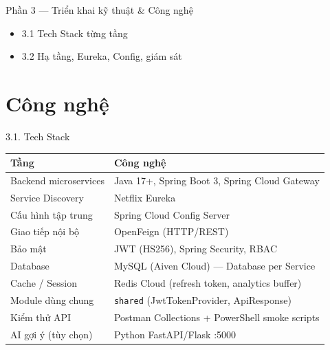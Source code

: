 \documentclass[aspectratio=169,12pt]{beamer}
\begin{document}
\begin{frame}{Phần 3 — Triển khai kỹ thuật \& Công nghệ}
  \begin{itemize}
    \item 3.1 Tech Stack từng tầng
    \item 3.2 Hạ tầng, Eureka, Config, giám sát
  \end{itemize}
\end{frame}

\section{Công nghệ}

\begin{frame}{3.1. Tech Stack}
  \begin{table}
    \centering
    \begin{tabular}{@{}ll@{}}
      \toprule
      \textbf{Tầng} & \textbf{Công nghệ} \\
      \midrule
      Backend microservices & Java 17+, Spring Boot 3, Spring Cloud Gateway \\
      Service Discovery     & Netflix Eureka \\
      Cấu hình tập trung    & Spring Cloud Config Server \\
      Giao tiếp nội bộ      & OpenFeign (HTTP/REST) \\
      Bảo mật               & JWT (HS256), Spring Security, RBAC \\
      Database              & MySQL (Aiven Cloud) — Database per Service \\
      Cache / Session       & Redis Cloud (refresh token, analytics buffer) \\
      Module dùng chung     & \texttt{shared} (JwtTokenProvider, ApiResponse) \\
      Kiểm thử API          & Postman Collections + PowerShell smoke scripts \\
      AI gợi ý (tùy chọn)   & Python FastAPI/Flask :5000 \\
      \bottomrule
    \end{tabular}
  \end{table}
\end{frame}
\end{document}
